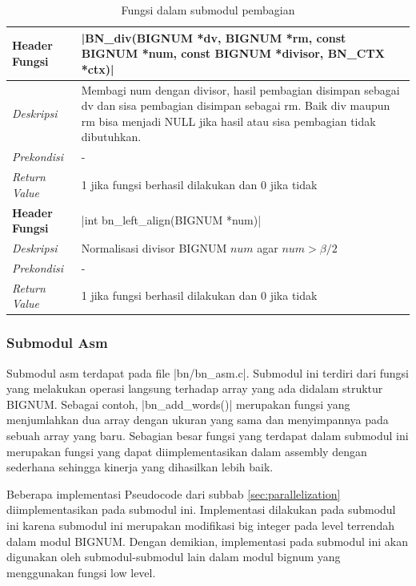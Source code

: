       \begin{table}[h]
        \caption{Fungsi dalam submodul pembagian}
        \begin{tabular}{R{2.8cm}L{10.5cm}}
          \toprule
          \textbf{Header Fungsi} & |BN_div(BIGNUM *dv, BIGNUM *rm, const BIGNUM *num, const BIGNUM *divisor, BN_CTX *ctx)|                                                                                                       \\ \midrule
          \textit{Deskripsi}     & Membagi num dengan divisor, hasil pembagian disimpan sebagai dv dan sisa pembagian disimpan sebagai rm. Baik div maupun rm bisa menjadi NULL jika hasil atau sisa pembagian tidak dibutuhkan. \\
          \textit{Prekondisi}    & - \\
          \textit{Return Value}  & 1 jika fungsi berhasil dilakukan dan 0 jika tidak
          \\ \bottomrule
          \textbf{Header Fungsi} & |int bn_left_align(BIGNUM *num)|                                                                                                                                                              \\ \midrule
          \textit{Deskripsi}     & Normalisasi divisor BIGNUM $num$ agar $num > \beta/2$  \\
          \textit{Prekondisi}    & - \\
          \textit{Return Value}  & 1 jika fungsi berhasil dilakukan dan 0 jika tidak
          \\ \bottomrule
        \end{tabular}
      \end{table}

    \subsubsection{Submodul Asm} \label{sec:bn_asm}
      Submodul asm terdapat pada file |bn/bn_asm.c|. Submodul ini terdiri dari fungsi yang melakukan operasi langsung terhadap array yang ada didalam struktur BIGNUM. Sebagai contoh, |bn_add_words()| merupakan fungsi yang menjumlahkan dua array dengan ukuran yang sama dan menyimpannya pada sebuah array yang baru. Sebagian besar fungsi yang terdapat dalam submodul ini merupakan fungsi yang dapat diimplementasikan dalam assembly dengan sederhana sehingga kinerja yang dihasilkan lebih baik.

      Beberapa implementasi Pseudocode dari subbab \ref{sec:parallelization} diimplementasikan pada submodul ini. Implementasi dilakukan pada submodul ini karena submodul ini merupakan modifikasi big integer pada level terrendah dalam modul BIGNUM. Dengan demikian, implementasi pada submodul ini akan digunakan oleh submodul-submodul lain dalam modul bignum yang menggunakan fungsi low level.

